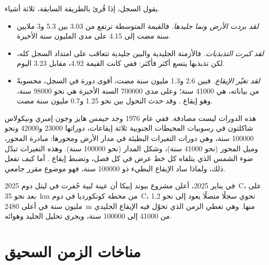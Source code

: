 يقول السجل، إذا قُرئ بالطريقة السابقة، ثلاثة أشياء.
\begin{itemize}
  \item \emph{لقد بردت الأرض ونما جليدها.} فالقيمة المتوسطة
        ترتفع من \qty{3.03}{\permil} بين 5.3 و3 ملايين سنة
        مضت إلى \qty{4.15}{\permil} على مدى المليون سنة الأخيرة.
  \item \emph{لقد كبرت التذبذبات.} فالأزمنة الجليدية والبين جليدية
        تتعاقب على امتداد السجل كله، لكن تذبذبها يتسع أكثر فأكثر: ففي
         كانت القيمة \qty{4.92}{\permil}، مقابل
        \qty{3.23}{\permil} اليوم.
  \item \emph{لقد تغيّر الإيقاع.} فبين 2.6 و1.3 مليون سنة
        مضت، أقوى دورة في السجل، محسوبةً من بياناته، هي
        \num{41000} سنة؛ وعلى مدى \num{700000} السنة الأخيرة هي نحو
        \num{98000} سنة، وهو إيقاع . وقد حدث التحول
        بين نحو 1.25 و0.7 مليون سنة مضت.
\end{itemize}

هذه الدورات ليست مصادفة. ففي عام 1976 وجد جيمس هايز وجون إمبري ونيكولاس
شاكلتون في رسوبيات المحيطات الجنوبية ثلاثة إيقاعات، دوراتها
\num{23000} و\num{42000} ونحو \num{100000} سنة، وهي دورات
التغيرات البطيئة في مدار الأرض ومحورها: مبادرة المحور،
وميل المحور (نحو \num{41000} سنة)، وشكل المدار
(نحو \num{100000} سنة). وهذه التغيرات تبدّل ضوء الشمس الذي يتلقاه كل
خط عرض في كل فصل، وتضبط إيقاع . أما كيف تفعل ذلك، ولماذا ساد الإيقاع البطيء ذو \num{100000} سنة،
فهو موضوع مقرر جامعي.

\begin{dated}{2025}
في يناير 2025، أعلن مشروع بيوند إبيكا أن عينة لبية حُفرت في
ليتل دوم~C، على بعد نحو \qty{35}{km} من محطة كونكورديا في دوم~C، تحوي
سجلًا متصلًا يعود إلى نحو 1.2 مليون سنة في أعلى
\qty{2480}{m} منها. وهي تغطي الزمن
الذي تحوّل فيه الإيقاع الجليدي من \num{41000} إلى \num{100000} سنة،
ويجري تحليل الجليد وهوائه.
\end{dated}

\section{مناخات الزمن السحيق}

